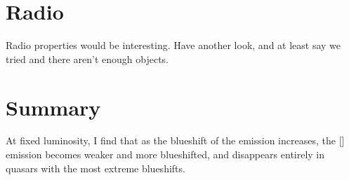 \section{Radio}

Radio properties would be interesting. 
Have another look, and at least say we tried and there aren't enough objects.




\section{Summary}

At fixed luminosity, I find that as the blueshift of the  emission increases, the [] emission becomes weaker and more blueshifted, and disappears entirely in quasars with the most extreme  blueshifts.  